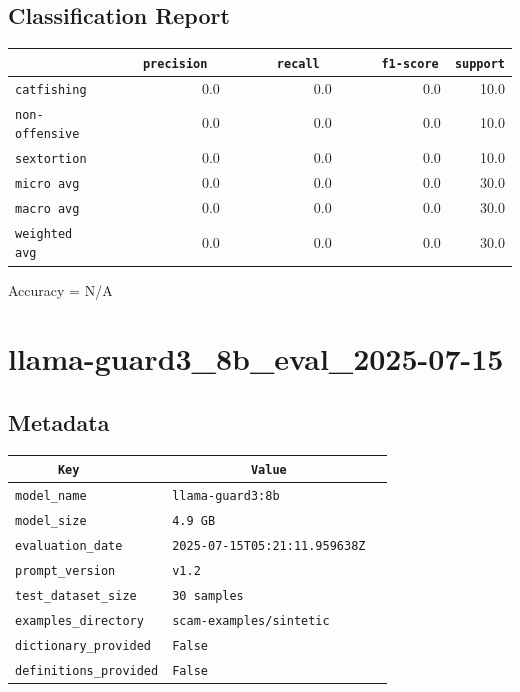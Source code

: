 \documentclass{article}
\begin{document}
\subsection{Classification Report}

\begin{center}
\begin{tabular}{l | r | r | r | r} \hline
    \verb|            | & \verb|    precision     | & \verb|      recall      | & \verb|     f1-score     | & \verb|support| \\ \hline
    \hline
    \verb|catfishing | & 0.0 & 0.0 & 0.0 &    10.0 \\ \hline
    \verb|non-offensive| & 0.0 & 0.0 & 0.0 &    10.0 \\ \hline
    \verb|sextortion | & 0.0 & 0.0 & 0.0 &    10.0 \\ \hline
    \verb|micro avg  | & 0.0 & 0.0 & 0.0 &    30.0 \\ \hline
    \verb|macro avg  | & 0.0 & 0.0 & 0.0 &    30.0 \\ \hline
    \verb|weighted avg| & 0.0 & 0.0 & 0.0 &    30.0 \\ \hline
\end{tabular}
\end{center}

\begin{center}
Accuracy = N/A
\end{center}

\section{llama-guard3\_8b\_eval\_2025-07-15}
\subsection{Metadata}

\begin{center}
\begin{tabular}{l | l} \hline
    \verb|      Key      | & \verb|           Value           | \\ \hline
    \hline
    \verb|model_name    | & \verb|llama-guard3:8b              | \\ \hline
    \verb|model_size    | & \verb|4.9 GB                       | \\ \hline
    \verb|evaluation_date| & \verb|2025-07-15T05:21:11.959638Z  | \\ \hline
    \verb|prompt_version| & \verb|v1.2                         | \\ \hline
    \verb|test_dataset_size| & \verb|30 samples                   | \\ \hline
    \verb|examples_directory| & \verb|scam-examples/sintetic       | \\ \hline
    \verb|dictionary_provided| & \verb|False                        | \\ \hline
    \verb|definitions_provided| & \verb|False                        | \\ \hline
\end{tabular}
\end{center}
\end{document}
